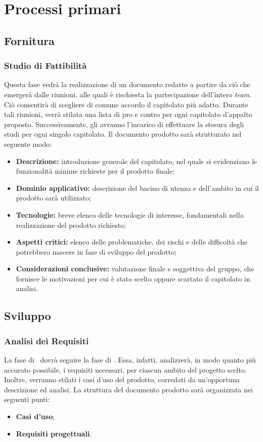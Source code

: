 \newpage
\section{Processi primari}

	\subsection{Fornitura}
		\subsubsection{Studio di Fattibilità}
		Questa fase vedrà la realizzazione di un documento redatto a partire da ciò che emergerà dalle riunioni, alle quali è rischiesta la partecipazione dell'intero \textit{team}. Ciò consentirà di scegliere di comune accordo il capitolato più adatto. Durante tali riunioni, verrà stilata una lista di pro e contro per ogni capitolato d'appalto proposto. Successivamente, gli \textit{\Anas} avranno l'incarico di effettuare la stesura degli studi per ogni singolo capitolato. Il documento prodotto sarà strutturato nel seguente modo:
		\begin{itemize}
		\item \textbf{Descrizione:} introduzione generale del capitolato, nel quale si evidenziano le funzionalità minime richieste per il prodotto finale;
		\item \textbf{Dominio applicativo:} descrizione del bacino di utenza e dell'ambito in cui il prodotto sarà utilizzato;
		\item \textbf{Tecnologie:} breve elenco delle tecnologie di interesse, fondamentali nella realizzazione del prodotto richiesto;
		\item \textbf{Aspetti critici:} elenco delle problematiche, dei rischi e delle difficoltà che potrebbero nascere in fase di sviluppo del prodotto;
		\item \textbf{Considerazioni conclusive:} valutazione finale e soggettiva del gruppo, che fornisce le motivazioni per cui è stato scelto oppure scartato il capitolato in analisi.
		\end{itemize}

	\subsection{Sviluppo}
	
		\subsubsection{Analisi dei Requisiti}
		La fase di \AdR\ dovrà seguire la fase di \SdF. Essa, infatti, analizzerà, in modo quanto più accurato possibile, i requisiti necessari, per ciascun ambito del progetto scelto. Inoltre, verranno stilati i casi d'uso del prodotto, corredati da un'opportuna descrizione ed analisi. La struttura del documento prodotto sarà organizzata nei seguenti punti:
		\begin{itemize}
			\item \textbf{Casi d'uso};
			\item \textbf{Requisiti progettuali}.
		\end{itemize}
		
